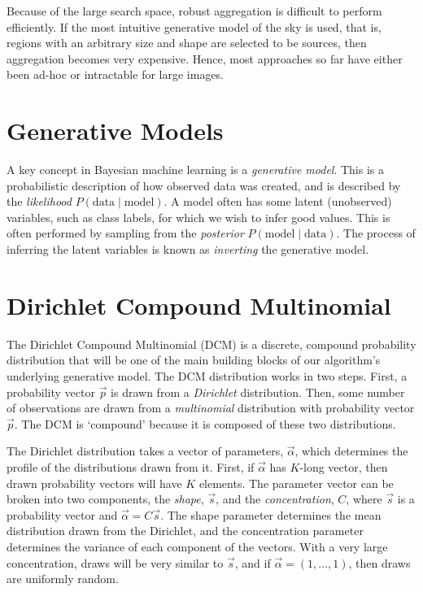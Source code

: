 Because of the large search space, robust aggregation is difficult to perform efficiently. If the most intuitive generative model of the sky is used, that is, regions with an arbitrary size and shape are selected to be sources, then aggregation becomes very expensive. Hence, most approaches so far have either been ad-hoc or intractable for large images.

\section{Generative Models} \label{s:generative_models}

A key concept in Bayesian machine learning is a \emph{generative model}. This is a probabilistic description of how observed data was created, and is described by the \emph{likelihood} $P(\text{data} \mid \text{model})$. A model often has some latent (unobserved) variables, such as class labels, for which we wish to infer good values. This is often performed by sampling from the \emph{posterior} $P(\text{model} \mid \text{data})$. The process of inferring the latent variables is known as \emph{inverting} the generative model.

\section{Dirichlet Compound Multinomial}

The Dirichlet Compound Multinomial (DCM) is a discrete, compound probability distribution that will be one of the main building blocks of our algorithm's underlying generative model. The DCM distribution works in two steps. First, a probability vector $\vec p$ is drawn from a \emph{Dirichlet} distribution. Then, some number of observations are drawn from a \emph{multinomial} distribution with probability vector $\vec p$. The DCM is `compound' because it is composed of these two distributions.

The Dirichlet distribution takes a vector of parameters, $\vec \alpha$, which determines the profile of the distributions drawn from it. First, if $\vec\alpha$ has $K$-long vector, then drawn probability vectors will have $K$ elements. The parameter vector can be broken into two components, the \emph{shape}, $\vec s$, and the \emph{concentration}, $C$, where $\vec s$ is a probability vector and $\vec \alpha = C \vec s$. The shape parameter determines the mean distribution drawn from the Dirichlet, and the concentration parameter determines the variance of each component of the vectors. With a very large concentration, draws will be very similar to $\vec s$, and if $\vec \alpha = (1, \ldots, 1)$, then draws are uniformly random.

